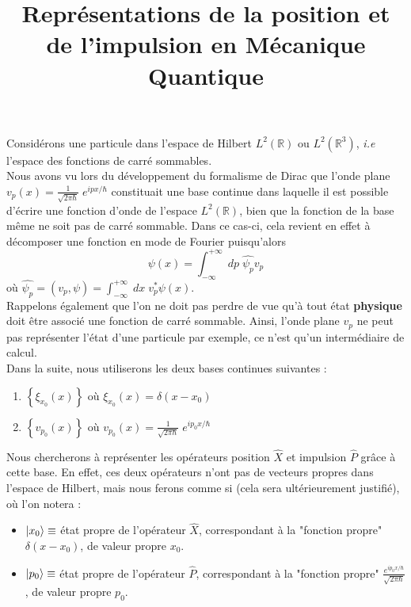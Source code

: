 \documentclass{article}
\title{Représentations de la position et de l'impulsion en Mécanique Quantique}
\date{}
\begin{document}
 
 \maketitle

 Considérons une particule dans l'espace de Hilbert $L^2(\mathbb{R})$ ou $L^2(\mathbb{R}^3)$, \textit{i.e} l'espace des fonctions de carré sommables. \\

Nous avons vu lors du développement du formalisme de Dirac que l'onde plane $v_p(x) = \frac{1}{\sqrt{2 \pi \hbar}} \; e^{ipx/\hbar}$ constituait une base continue dans laquelle il est possible d'écrire une fonction d'onde de l'espace $L^2(\mathbb{R})$, bien que la fonction de la base même ne soit pas de carré sommable. Dans ce cas-ci, cela revient en effet à décomposer une fonction en mode de Fourier puisqu'alors $$ \psi(x) = \int_{-\infty}^{+\infty} \; dp \; \hat{\psi_p} v_p $$ où $\hat{\psi_p} = (v_p, \psi) = \int_{-\infty}^{+\infty} \; dx \; v_p^* \psi(x)$. \\
Rappelons également que l'on ne doit pas perdre de vue qu'à tout état \textbf{physique} doit être associé une fonction de carré sommable. Ainsi, l'onde plane $v_p$ ne peut pas représenter l'état d'une particule par exemple, ce n'est qu'un intermédiaire de calcul. \\

Dans la suite, nous utiliserons les deux bases continues suivantes : 
\begin{enumerate}
    \item $\left\{ \xi_{x_0}(x) \right\}$ où $\xi_{x_0}(x) = \delta(x-x_0)$ 
    \item $\left\{ v_{p_0}(x) \right\}$ où $v_{p_0}(x) = \frac{1}{\sqrt{2\pi \hbar}} \; e^{ip_0 x/\hbar}$ \\
\end{enumerate}
Nous chercherons à représenter les opérateurs position $\hat{X}$ et impulsion $\hat{P}$ grâce à cette base. En effet, ces deux opérateurs n'ont pas de vecteurs propres dans l'espace de Hilbert, mais nous ferons comme si (cela sera ultérieurement justifié), où l'on notera : 
\begin{itemize}[label = \textbullet]
    \item $\ket{x_0} \equiv$ état propre de l'opérateur $\hat{X}$, correspondant à la "fonction propre" $\delta(x-x_0)$, de valeur propre $x_0$. 
    \item $\ket{p_0} \equiv$ état propre de l'opérateur $\hat{P}$, correspondant à la "fonction propre" $\frac{e^{ip_0 x/\hbar}}{\sqrt{2 \pi \hbar}}$, de valeur propre $p_0$. 
\end{itemize}
\end{document}
